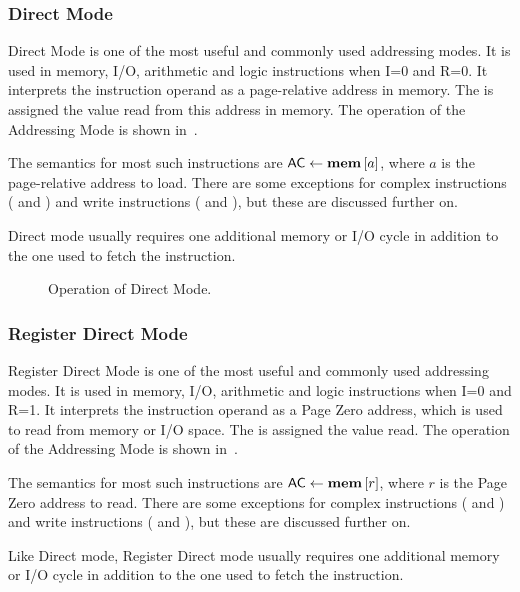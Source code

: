 \subsubsection{Direct Mode}
\label{sec:direct-mode}

Direct Mode is one of the most useful and commonly used addressing modes. It is
used in memory, I/O, arithmetic and logic instructions when I=0 and R=0. It
interprets the instruction operand as a page-relative address in memory. The
\AC{} is assigned the value read from this address in memory. The operation of
the \gls{Addressing Mode} is shown in~.

The semantics for most such instructions are $\mbox{\AC}\eq\mem{a}$, where $a$
is the page-relative address to load. There are some exceptions for complex
instructions ( and ) and write instructions ( and
), but these are discussed further on.

Direct mode usually requires one additional memory or I/O cycle in addition to
the one used to fetch the instruction.

\begin{figure}[htb]
 \centering
\caption[Direct Mode]{\label{fig:direct-mode} Operation of Direct Mode.}
\end{figure}


\subsubsection{Register Direct Mode}
\label{sec:register-direct-mode}

Register Direct Mode is one of the most useful and commonly used addressing
modes. It is used in memory, I/O, arithmetic and logic instructions when I=0
and R=1. It interprets the instruction operand as a \gls{Page Zero} address,
which is used to read from memory or I/O space. The \AC{} is assigned the value
read. The operation of the \gls{Addressing Mode} is shown
in~.

The semantics for most such instructions are $\mbox{\AC}\eq\mem{r}$, where $r$
is the Page Zero address to read. There are some exceptions for complex
instructions ( and ) and write instructions ( and
), but these are discussed further on.

Like Direct mode, Register Direct mode usually requires one additional memory
or I/O cycle in addition to the one used to fetch the instruction.

